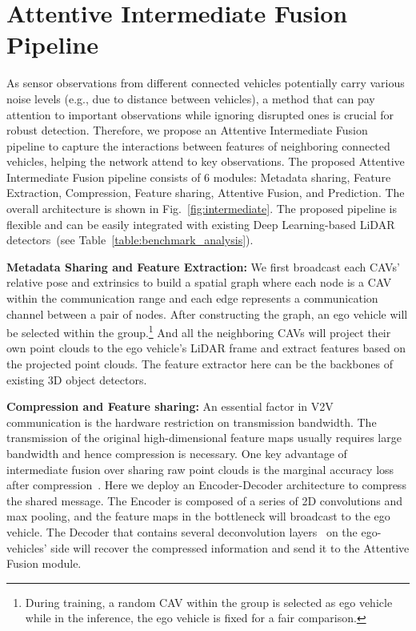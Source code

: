 \documentclass[letterpaper, 10 pt, conference]{ieeeconf}
\begin{document}
\section{Attentive Intermediate Fusion Pipeline}
As sensor observations from different connected vehicles potentially carry various noise levels (e.g., due to distance between vehicles), a method that can pay attention to important observations while ignoring disrupted ones is crucial for robust detection. Therefore, we propose an Attentive Intermediate Fusion pipeline to capture the interactions between features of neighboring connected vehicles, helping the network attend to key observations. The proposed Attentive Intermediate Fusion pipeline consists of 6 modules: Metadata sharing, Feature Extraction, Compression, Feature sharing, Attentive Fusion, and Prediction. The overall architecture is shown in Fig.~\ref{fig:intermediate}. The proposed pipeline is flexible and can be easily integrated with existing Deep Learning-based LiDAR detectors~(see Table~\ref{table:benchmark_analysis}). 


\noindent\textbf{Metadata Sharing and Feature Extraction: }We first broadcast each CAVs' relative pose and extrinsics to build a spatial graph where each node is a CAV within the communication range and each edge represents a communication channel between a pair of nodes. After constructing the graph, an ego vehicle will be selected within the group.\footnote{During training, a random CAV within the group is selected as ego vehicle while in the inference, the ego vehicle is fixed for a fair comparison.} And all the neighboring  CAVs will project their own point clouds to the ego vehicle's LiDAR frame and extract features based on the projected point clouds. The feature extractor here can be the backbones of existing 3D object detectors.

\noindent\textbf{Compression and Feature sharing: }An essential factor in V2V communication is the hardware restriction on transmission bandwidth. The transmission of the original high-dimensional feature maps usually requires large bandwidth and hence compression is necessary.  One key advantage of intermediate fusion over sharing raw point clouds is the marginal accuracy loss after compression~\cite{Wang2020V2VNetVC}. Here we deploy an Encoder-Decoder architecture to compress the shared message. The Encoder is composed of a series of 2D convolutions and max pooling, and the feature maps in the bottleneck will broadcast to the ego vehicle. The Decoder that contains several deconvolution layers~\cite{noh2015learning} on the ego-vehicles' side will recover the compressed information and send it to the Attentive Fusion module. 
\end{document}
